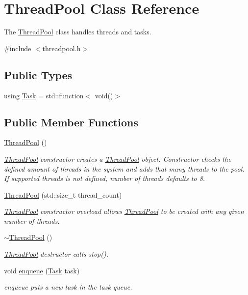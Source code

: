 \hypertarget{classThreadPool}{\section{Thread\-Pool Class Reference}
\label{classThreadPool}
}


The \hyperlink{classThreadPool}{Thread\-Pool} class handles threads and tasks.  




{\ttfamily \#include $<$threadpool.\-h$>$}

\subsection*{Public Types}
\begin{DoxyCompactItemize}
\item 
using \hyperlink{classThreadPool_a9ccb63332c10a0b36c7475f5e8629010}{Task} = std\-::function$<$ void()$>$
\end{DoxyCompactItemize}
\subsection*{Public Member Functions}
\begin{DoxyCompactItemize}
\item 
\hyperlink{classThreadPool_a3225e86aa7835545b3f6c2c8d363d5e5}{Thread\-Pool} ()
\begin{DoxyCompactList}\small\item\em \hyperlink{classThreadPool}{Thread\-Pool} constructor creates a \hyperlink{classThreadPool}{Thread\-Pool} object. Constructor checks the defined amount of threads in the system and adds that many threads to the pool. If supported threads is not defined, number of threads defaults to 8. \end{DoxyCompactList}\item 
\hyperlink{classThreadPool_a742d47b13aee454402f90dfaca486c30}{Thread\-Pool} (std\-::size\-\_\-t thread\-\_\-count)
\begin{DoxyCompactList}\small\item\em \hyperlink{classThreadPool}{Thread\-Pool} constructor overload allows \hyperlink{classThreadPool}{Thread\-Pool} to be created with any given number of threads. \end{DoxyCompactList}\item 
\hyperlink{classThreadPool_a44d3d2ab618970605e684efc216655eb}{$\sim$\-Thread\-Pool} ()
\begin{DoxyCompactList}\small\item\em \hyperlink{classThreadPool}{Thread\-Pool} destructor calls stop(). \end{DoxyCompactList}\item 
void \hyperlink{classThreadPool_aa49e3d9f1ea6e6aafd00d7635e4ae61e}{enqueue} (\hyperlink{classThreadPool_a9ccb63332c10a0b36c7475f5e8629010}{Task} task)
\begin{DoxyCompactList}\small\item\em enqueue puts a new task in the task queue. \end{DoxyCompactList}\end{DoxyCompactItemize}


